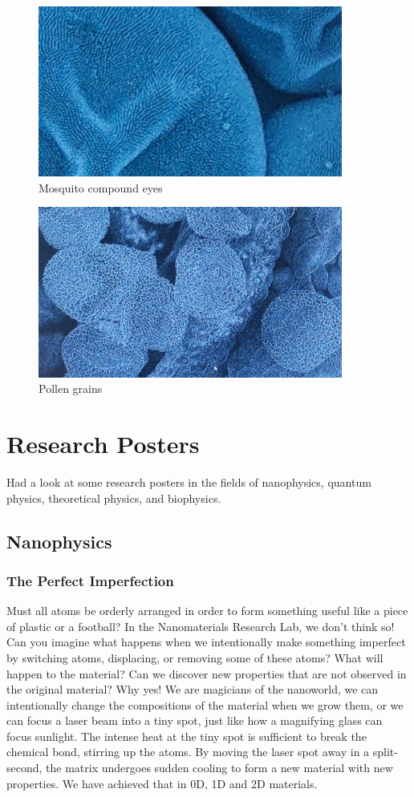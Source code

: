 \documentclass[12pt,a4paper]{article}
\begin{document}
\begin{figure}[H]
    \centering
    \includegraphics[width=10cm]{images/sem_mosquito.jpg}
    \caption{Mosquito compound eyes}
\end{figure}

\begin{figure}[H]
    \centering
    \includegraphics[width=10cm]{images/sem_pollen.jpg}
    \caption{Pollen grains}
\end{figure}
\pagebreak

\section{Research Posters}
Had a look at some research posters in the fields of nanophysics, quantum physics, theoretical physics, and biophysics.

\subsection{Nanophysics}
\subsubsection{The Perfect Imperfection}
Must all atoms be orderly arranged in order to form something useful like a piece of plastic or a football? In the Nanomaterials Research Lab, we don't think so! Can you imagine what happens when we intentionally make something imperfect by switching atoms, displacing, or removing some of these atoms? What will happen to the material? Can we discover new properties that are not observed in the original material? Why yes! We are magicians of the nanoworld, we can intentionally change the compositions of the material when we grow them, or we can focus a laser beam into a tiny spot, just like how a magnifying glass can focus sunlight. The intense heat at the tiny spot is sufficient to break the chemical bond, stirring up the atoms. By moving the laser spot away in a split-second, the matrix undergoes sudden cooling to form a new material with new properties. We have achieved that in 0D, 1D and 2D materials.
\end{document}
